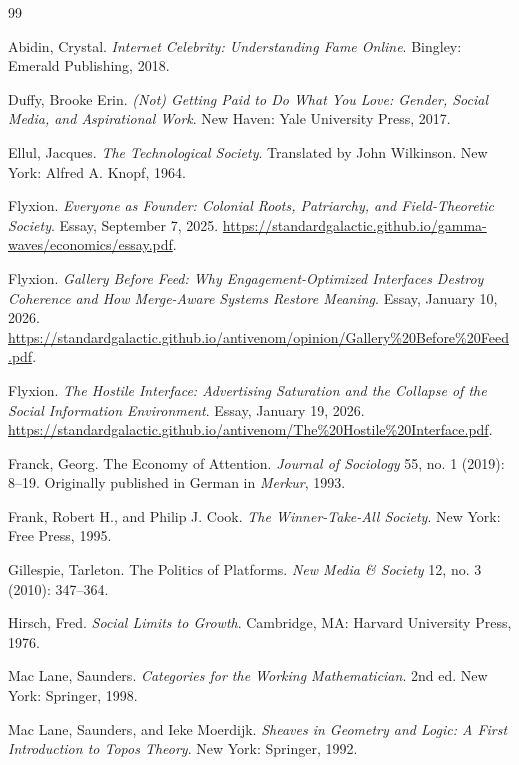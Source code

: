 \documentclass[12pt]{article}
\theoremstyle{plain}
\theoremstyle{definition}
\begin{document}
\begin{thebibliography}{99}

Abidin, Crystal.
\textit{Internet Celebrity: Understanding Fame Online}.
Bingley: Emerald Publishing, 2018.

Duffy, Brooke Erin.
\textit{(Not) Getting Paid to Do What You Love: Gender, Social Media, and Aspirational Work}.
New Haven: Yale University Press, 2017.

Ellul, Jacques.
\textit{The Technological Society}.
Translated by John Wilkinson.
New York: Alfred A. Knopf, 1964.

Flyxion.
\textit{Everyone as Founder: Colonial Roots, Patriarchy, and Field-Theoretic Society}.
Essay, September 7, 2025.
\url{https://standardgalactic.github.io/gamma-waves/economics/essay.pdf}.

Flyxion.
\textit{Gallery Before Feed: Why Engagement-Optimized Interfaces Destroy Coherence and How Merge-Aware Systems Restore Meaning}.
Essay, January 10, 2026.
\url{https://standardgalactic.github.io/antivenom/opinion/Gallery\%20Before\%20Feed.pdf}.

Flyxion.
\textit{The Hostile Interface: Advertising Saturation and the Collapse of the Social Information Environment}.
Essay, January 19, 2026.
\url{https://standardgalactic.github.io/antivenom/The\%20Hostile\%20Interface.pdf}.

Franck, Georg.
The Economy of Attention.
\textit{Journal of Sociology} 55, no. 1 (2019): 8--19.
Originally published in German in \textit{Merkur}, 1993.

Frank, Robert H., and Philip J. Cook.
\textit{The Winner-Take-All Society}.
New York: Free Press, 1995.

Gillespie, Tarleton.
The Politics of Platforms.
\textit{New Media \& Society} 12, no. 3 (2010): 347--364.

Hirsch, Fred.
\textit{Social Limits to Growth}.
Cambridge, MA: Harvard University Press, 1976.

Mac Lane, Saunders.
\textit{Categories for the Working Mathematician}.
2nd ed.
New York: Springer, 1998.

Mac Lane, Saunders, and Ieke Moerdijk.
\textit{Sheaves in Geometry and Logic: A First Introduction to Topos Theory}.
New York: Springer, 1992.


\end{thebibliography}
\end{document}
